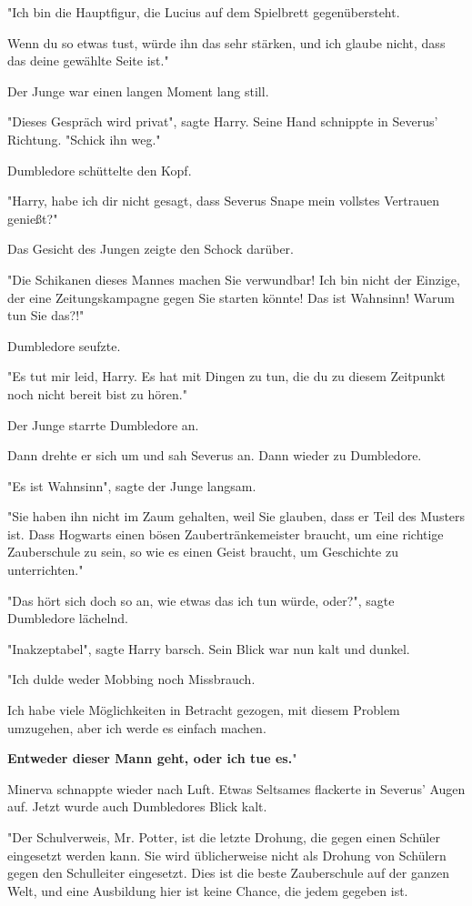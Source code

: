 {"Ich bin die Hauptfigur, die Lucius auf dem Spielbrett gegenübersteht.

Wenn du so etwas tust, würde ihn das sehr stärken, und ich glaube nicht, dass das deine gewählte Seite ist."

Der Junge war einen langen Moment lang still.

"Dieses Gespräch wird privat", sagte Harry. Seine Hand schnippte in Severus' Richtung. "Schick ihn weg."

Dumbledore schüttelte den Kopf.

"Harry, habe ich dir nicht gesagt, dass Severus Snape mein vollstes Vertrauen genießt?"

Das Gesicht des Jungen zeigte den Schock darüber.

"Die Schikanen dieses Mannes machen Sie verwundbar! Ich bin nicht der Einzige, der eine Zeitungskampagne gegen Sie starten könnte! Das ist Wahnsinn! Warum tun Sie das?!"

Dumbledore seufzte.

"Es tut mir leid, Harry. Es hat mit Dingen zu tun, die du zu diesem Zeitpunkt noch nicht bereit bist zu hören."

Der Junge starrte Dumbledore an.

Dann drehte er sich um und sah Severus an. Dann wieder zu Dumbledore.

"Es ist Wahnsinn", sagte der Junge langsam.

"Sie haben ihn nicht im Zaum gehalten, weil Sie glauben, dass er Teil des Musters ist. Dass Hogwarts einen bösen Zaubertränkemeister braucht, um eine richtige Zauberschule zu sein, so wie es einen Geist braucht, um Geschichte zu unterrichten."

"Das hört sich doch so an, wie etwas das ich tun würde, oder?", sagte Dumbledore lächelnd.

"Inakzeptabel", sagte Harry barsch. Sein Blick war nun kalt und dunkel.

"Ich dulde weder Mobbing noch Missbrauch.

Ich habe viele Möglichkeiten in Betracht gezogen, mit diesem Problem umzugehen, aber ich werde es einfach machen.

\textbf{Entweder dieser Mann geht, oder ich tue es.}"

Minerva schnappte wieder nach Luft. Etwas Seltsames flackerte in Severus' Augen auf. Jetzt wurde auch Dumbledores Blick kalt.

"Der Schulverweis, Mr. Potter, ist die letzte Drohung, die gegen einen Schüler eingesetzt werden kann. Sie wird üblicherweise nicht als Drohung von Schülern gegen den Schulleiter eingesetzt. Dies ist die beste Zauberschule auf der ganzen Welt, und eine Ausbildung hier ist keine Chance, die jedem gegeben ist.

}
